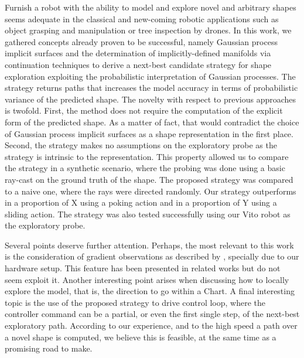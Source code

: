Furnish a robot with the ability to model and explore novel and arbitrary shapes seems adequate in the classical and new-coming robotic applications such as object grasping and manipulation or tree inspection by drones. 
In this work, we gathered concepts already proven to be successful, namely Gaussian process implicit surfaces and the determination of implicitly-defined manifolds via continuation techniques to derive a next-best candidate strategy for shape exploration exploiting the probabilistic interpretation of Gaussian processes. 
The strategy returns paths that increases the model accuracy in terms of probabilistic variance of the predicted shape. The novelty with respect to previous approaches is twofold.
First, the method does not require the computation of the explicit form of the predicted shape. As a matter of fact, that would contradict the choice of Gaussian process implicit surfaces as a shape representation in the first place. 
Second, the strategy makes no assumptions on the exploratory probe as the strategy is intrinsic to the representation. This property allowed us to compare the strategy in a synthetic scenario, where the probing was done using a basic ray-cast on the ground truth of the shape. The proposed strategy was compared to a naive one, where the rays were directed randomly. Our strategy outperforms in a proportion of X using a poking action and in a proportion of Y using a sliding action.
The strategy was also tested successfully using our Vito robot as the exploratory probe.

Several points deserve further attention. Perhaps, the most relevant to this work is the consideration of gradient observations as described by \citet{Solak2003Derivative}, specially due to our hardware setup. This feature has been presented in related works but do not seem exploit it. Another interesting point arises when discussing how to locally explore the model, that is, the direction to go within a Chart. 
A final interesting topic is the use of the proposed strategy to drive control loop, where the controller command can be a partial, or even the first  single step, of the next-best exploratory path. According to our experience, and to the high speed a path over a novel shape is computed, we believe this is feasible, at the same time as a promising road to make.
